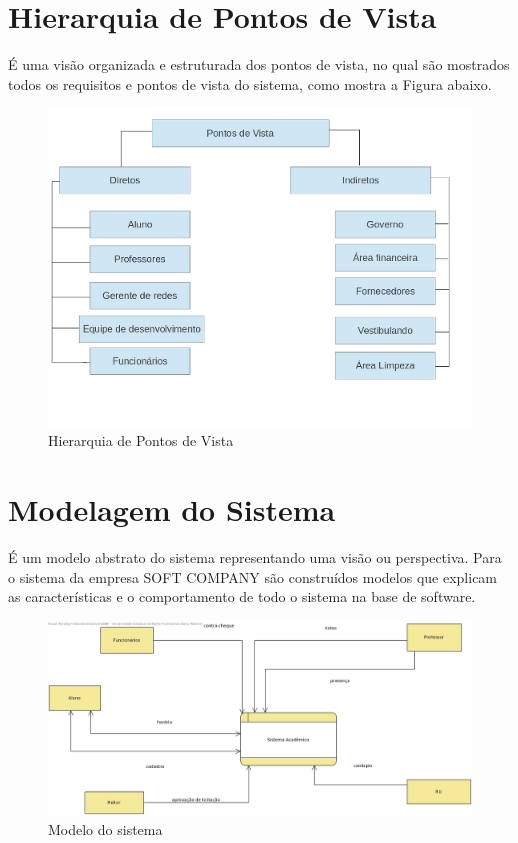 \section {Hierarquia de Pontos de Vista}
	
É uma visão organizada e estruturada dos pontos de vista, no qual são mostrados todos os requisitos e pontos de vista do sistema, como mostra a Figura abaixo.
   \begin{figure}[H]
	      \centering
	       \includegraphics{hierarquia2}
	       \caption{Hierarquia de Pontos de Vista}
	       \label{figRotulo}
               \end{figure}
               
               
    
 \section{Modelagem do Sistema}
 
 É um modelo abstrato do sistema representando uma visão ou perspectiva.
 Para o sistema da empresa SOFT COMPANY são construídos modelos que explicam as características
 e o comportamento de todo o sistema na base de software.
 
   \begin{figure}[H]
	      \centering
	       \includegraphics{diagrama1.jpg}
	       \caption{Modelo do sistema}
	       \label{figRotulo}
               \end{figure}
 